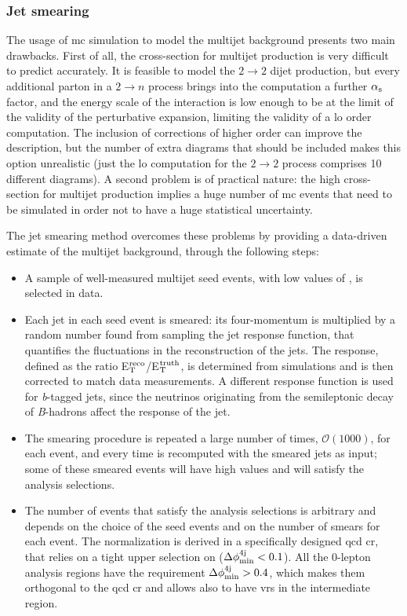 \subsubsection*{Jet smearing}
\label{sec:jet_smearing}

The usage of \gls{mc} simulation to model the multijet background presents two main drawbacks.
First of all, the cross-section for multijet production is very difficult to predict accurately. 
It is feasible to model the $2 \to 2$ dijet production, 
but every additional parton in a $2 \to n$ process brings into the computation a further $\alpha_{\rm{s}}$ factor, 
and the energy scale of the interaction is low enough to be at the limit of the validity of the perturbative expansion, limiting the validity of a  \gls{lo} order computation. The inclusion of corrections of higher order can improve the description, but the number of extra diagrams that should be included makes this option unrealistic (just the \gls{lo} computation for the $2 \to 2$ process comprises 10 different diagrams).
A second problem is of practical nature: the high cross-section for multijet production implies a huge number of \gls{mc} events that need to be simulated in order not to have a huge statistical uncertainty. 

The jet smearing method overcomes these problems by providing a data-driven estimate of the multijet background, through the following steps:
\begin{itemize}
\item A sample of well-measured multijet seed events, with low values of \met, is selected in data.

\item Each jet in each seed event is smeared: its four-momentum is multiplied by a random number found from sampling the jet response function, that quantifies the fluctuations in the \pt reconstruction of the jets. The response, defined as the ratio E$_{\rm{T}}^{\rm{reco}}$/E$_{\rm{T}}^{\rm{truth}}$, is determined from simulations and is then corrected to match data measurements. 
A different response function is used for \textit{b}-tagged jets, 
since the neutrinos originating from the semileptonic decay of \textit{B}-hadrons affect the response of the jet. 
 

\item The smearing procedure is repeated a large number of times, $\mathcal{O}(1000)$, for each event, and every time \met is recomputed with the smeared jets as input; some of these smeared events will have high \met values and will satisfy the analysis selections.

\item The number of events that satisfy the analysis selections is arbitrary and depends on the choice of the seed events and on the number of smears for each event. The normalization is derived in a specifically designed \gls{qcd} \gls{cr}, that relies on a tight upper selection on \dphimin ($\Delta\phi_{\rm{min}}^{4{\rm{j}}} < 0.1$). All the 0-lepton analysis regions have the requirement $\Delta\phi_{\rm{min}}^{4{\rm{j}}} > 0.4$, which makes them orthogonal to the \gls{qcd} \gls{cr} and allows also to have \glspl{vr} in the intermediate region. 
\end{itemize}

